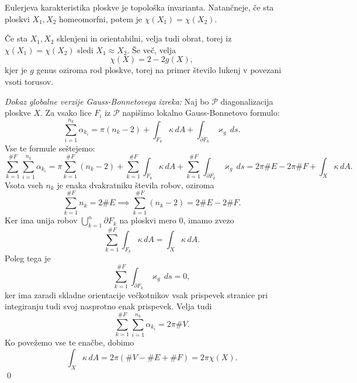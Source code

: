 \begin{izrek}
\label{izr_Eulerjeva_karakteristika_je_topoloska_invarianta}
Eulerjeva karakteristika ploskve je topološka invarianta. Natančneje, če sta ploskvi $X_1, X_2$ homeomorfni, potem 
je $\chi(X_1) = \chi(X_2)$. 
\end{izrek}

Če sta $X_1, X_2$ sklenjeni in orientabilni, velja tudi obrat, torej iz $\chi(X_1) = \chi(X_2)$ sledi $X_1 \approx X_2$. Še več, velja \begin{equation*}
\chi(X) = 2 - 2g(X),
\end{equation*}  
kjer je $g$ genus oziroma rod ploskve, torej na primer število lukenj v povezani vsoti torusov.

\noindent
{\em Dokaz globalne verzije Gauss-Bonnetovega izreka:\/}
Naj bo $\mathcal{P}$ diagonalizacija ploskve $X$. Za vsako lice $F_i$ iz $\mathcal{P}$ napišimo lokalno Gauss-Bonnetovo formulo:
\begin{equation*}
\sum_{i = 1}^{n_k} \alpha_{k_i} = \pi(n_k - 2) + \int_{F_k} \kappa \, dA + \int_{\partial F_k } \varkappa_g \, ds.  
\end{equation*}  
Vse te formule seštejemo: \begin{equation*}
\sum_{k = 1}^{\#F} \sum_{i = 1}^{n_k} \alpha_{k_i} = \pi \sum_{k = 1}^{\#F}  (n_k - 2) + \sum_{k = 1}^{\#F}  \int_{F_k} \kappa \, dA + \sum_{k = 1}^{\#F}  \int_{\partial F_k } \varkappa_g \, ds = 2 \pi \#E - 2\pi \# F + \int_{X} \kappa \, dA. 
\end{equation*}  
Vsota vseh $n_k$ je enaka dvakratniku števila robov, oziroma \begin{equation*}
    \sum_{k = 1}^{\#F} n_k = 2 \# E \implies \sum_{k = 1}^{\#F}  (n_k - 2) = 2 \# E - 2 \# F.
\end{equation*}  
  Ker ima unija robov $\bigcup_{k = 1}^{n} \partial F_k$ na ploskvi mero $0$, imamo zvezo \begin{equation*}
    \sum_{k = 1}^{\#F}  \int_{F_k} \kappa \, dA = \int_{X} \kappa \, dA.  
  \end{equation*}  
Poleg tega je\begin{equation*}
    \sum_{k = 1}^{\#F} \int_{\partial F_k} \varkappa_g \, ds = 0, 
\end{equation*}  
ker ima zaradi skladne orientacije večkotnikov vsak prispevek stranice pri integiranju tudi svoj nasprotno enak prispevek. 
Velja tudi \begin{equation*}
    \sum_{k = 1}^{\#F} \sum_{i = 1}^{n_k} \alpha_{k_i} = 2 \pi \# V.
\end{equation*}  
Ko povežemo vse te enačbe, dobimo \begin{equation*}
\int_{X} \kappa \, dA = 2 \pi (\# V - \# E + \# F ) = 2 \pi \chi(X). 
\end{equation*} 
 \qed

